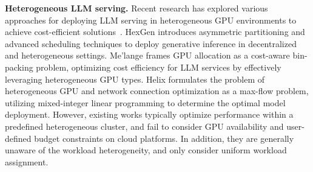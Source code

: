 


\textbf{Heterogeneous LLM serving.} Recent research has explored various approaches for deploying LLM serving in heterogeneous GPU environments to achieve cost-efficient solutions~\cite{jiang2023hexgen,miao2024spotserve,griggs2024m,zhao2024llm,mei2024helix,borzunov2022petals}. 
HexGen introduces asymmetric partitioning and advanced scheduling techniques to deploy generative inference in decentralized and heterogeneous settings. Me'lange frames GPU allocation as a cost-aware bin-packing problem, optimizing cost efficiency for LLM services by effectively leveraging heterogeneous GPU types. 
Helix formulates the problem of heterogeneous GPU and network connection optimization as a max-flow problem, utilizing mixed-integer linear programming to determine the optimal model deployment.
However, existing works typically optimize performance within a predefined heterogeneous cluster, and fail to consider GPU availability and user-defined budget constraints on cloud platforms. 
In addition, they are generally unaware of the workload heterogeneity, and only consider uniform workload assignment.

